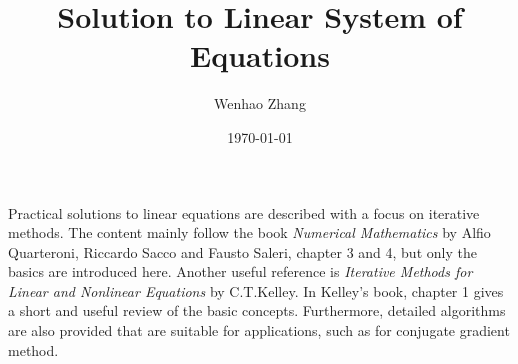 \documentclass{article}
\begin{document}
\title{Solution to Linear System of Equations}
\author{Wenhao Zhang}
\date{\today}
\maketitle

Practical solutions to linear equations are described with a focus on 
iterative methods. The content mainly follow the book \emph{Numerical Mathematics} by 
Alfio Quarteroni, Riccardo Sacco and Fausto Saleri, chapter 3 and 4, but only the 
basics are introduced here. Another useful reference is \emph{Iterative Methods for Linear and Nonlinear Equations}
by C.T.Kelley. In Kelley's book, chapter 1 gives a short and useful review of the basic 
concepts. Furthermore, detailed algorithms are also provided that are suitable for 
applications, such as for conjugate gradient method.

\tableofcontents




\end{document}
